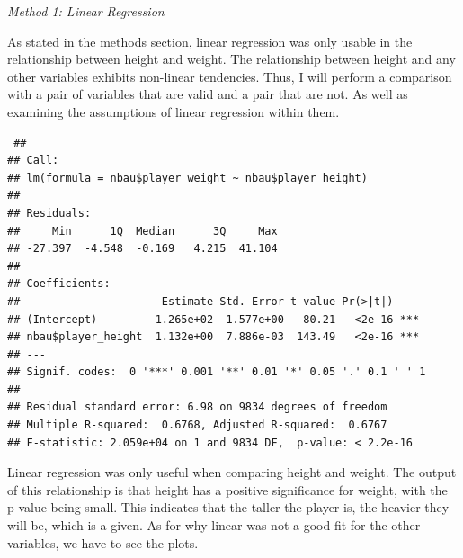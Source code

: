 \documentclass[11pt,letterpaper]{amsart}
\begin{document}
\begin{center}
\emph{{\LARGE Method 1: Linear Regression}}
\end{center} \leavevmode \newline

\indent As stated in the methods section, linear regression was only usable in the relationship between height and weight. The relationship between height and any other variables exhibits non-linear tendencies. Thus, I will perform a comparison with a pair of variables that are valid and a pair that are not. As well as examining the assumptions of linear regression within them.
\begin{verbatim}
 ## 
## Call:
## lm(formula = nbau$player_weight ~ nbau$player_height)
## 
## Residuals:
##     Min      1Q  Median      3Q     Max 
## -27.397  -4.548  -0.169   4.215  41.104 
## 
## Coefficients:
##                      Estimate Std. Error t value Pr(>|t|)    
## (Intercept)        -1.265e+02  1.577e+00  -80.21   <2e-16 ***
## nbau$player_height  1.132e+00  7.886e-03  143.49   <2e-16 ***
## ---
## Signif. codes:  0 '***' 0.001 '**' 0.01 '*' 0.05 '.' 0.1 ' ' 1
## 
## Residual standard error: 6.98 on 9834 degrees of freedom
## Multiple R-squared:  0.6768, Adjusted R-squared:  0.6767 
## F-statistic: 2.059e+04 on 1 and 9834 DF,  p-value: < 2.2e-16
\end{verbatim} \leavevmode \newline

Linear regression was only useful when comparing height and weight. The output of this relationship is that height has a positive significance for weight, with the p-value being small. This indicates that the taller the player is, the heavier they will be, which is a given. As for why linear was not a good fit for the other variables, we have to see the plots.\\
\end{document}
